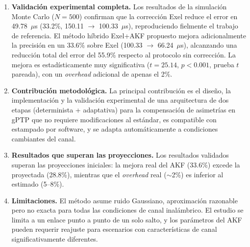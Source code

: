 \begin{enumerate}
\item \textbf{Validación experimental completa.} Los resultados de la simulación Monte Carlo ($N = 500$) confirman que la corrección Exel reduce el error en 49.78~$\mu$s (33.2\%, 150.11 $\rightarrow$ 100.33~$\mu$s), reproduciendo fielmente el trabajo de referencia. El método híbrido Exel+AKF propuesto mejora adicionalmente la precisión en un 33.6\% sobre Exel (100.33 $\rightarrow$ 66.24~$\mu$s), alcanzando una reducción total del error del 55.9\% respecto al protocolo sin corrección. La mejora es estadísticamente muy significativa ($t = 25.14$, $p < 0.001$, prueba $t$ pareada), con un \textit{overhead} adicional de apenas el 2\%.

\item \textbf{Contribución metodológica.} La principal contribución es el diseño, la implementación y la validación experimental de una arquitectura de dos etapas (determinista + adaptativa) para la compensación de asimetrías en gPTP que no requiere modificaciones al estándar, es compatible con estampado por software, y se adapta automáticamente a condiciones cambiantes del canal.

\item \textbf{Resultados que superan las proyecciones.} Los resultados validados superan las proyecciones iniciales: la mejora real del AKF (33.6\%) excede la proyectada (28.8\%), mientras que el \textit{overhead} real ($\sim$2\%) es inferior al estimado (5--8\%).

\item \textbf{Limitaciones.} El método asume ruido Gaussiano, aproximación razonable pero no exacta para todas las condiciones de canal inalámbrico. El estudio se limita a un enlace punto a punto de un solo salto, y los parámetros del AKF pueden requerir reajuste para escenarios con características de canal significativamente diferentes.
\end{enumerate}
